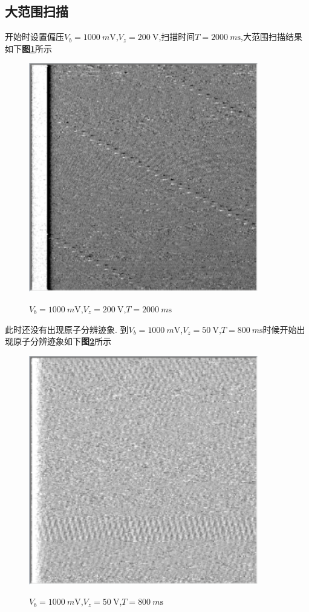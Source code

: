 \documentclass[a4paper]{article}
\begin{document}
\subsection{大范围扫描}\label{sub:1}
开始时设置偏压$V_b=\SI{1000}{m\volt}$,$V_z=\SI{200}{\volt}$,扫描时间$T=\SI{2000}{m\s}$,大范围扫描结果如下\textbf{图\ref{result:fig1}}所示 
\begin{figure}[H]
 \centering
 \caption{$V_b=\SI{1000}{m\volt}$,$V_z=\SI{200}{\volt}$,$T=\SI{2000}{m\s}$}
 \includegraphics[height=10cm, width=10cm]{images/200V-1000mV-2000ms.png}
 \label{result:fig1}
\end{figure}
此时还没有出现原子分辨迹象.
到$V_b=\SI{1000}{m\volt}$,$V_z=\SI{50}{\volt}$,$T=\SI{800}{m\s}$时候开始出现原子分辨迹象如下\textbf{图\ref{result:fig2}}所示
\begin{figure}[H]
 \centering
 \caption{$V_b=\SI{1000}{m\volt}$,$V_z=\SI{50}{\volt}$,$T=\SI{800}{m\s}$}
 \includegraphics[height=10cm, width=10cm]{images/50V-1000mV-800ms.png}
 \label{result:fig2}
\end{figure}
\end{document}
